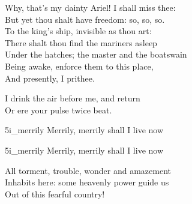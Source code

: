 \begin{song}
\end{song}

\begin{verse_speech}[Prospero] 
Why, that's my dainty Ariel! I shall miss thee:\\
But yet thou shalt have freedom: so, so, so.\\
To the king's ship, invisible as thou art:\\
There shalt thou find the mariners asleep\\
Under the hatches; the master and the boatswain\\
Being awake, enforce them to this place,\\
And presently, I prithee.
\end{verse_speech}

\begin{verse_speech}[Ariel] 
I drink the air before me, and return\\
Or ere your pulse twice beat.
\end{verse_speech}


\begin{pictures} %
	\begin{letter}
		\begin{colorbigpic}
			[1.1]
			{5i_merrily}
			{Merrily, merrily shall I live now}
		\end{colorbigpic}
	\end{letter}
	\begin{a4}
		\begin{colorbigpic}
			[1]
			{5i_merrily}
			{Merrily, merrily shall I live now}
		\end{colorbigpic}
	\end{a4}
\end{pictures}

\begin{verse_speech}[Gonzalo] 
All torment, trouble, wonder and amazement\\
Inhabits here: some heavenly power guide us\\
Out of this fearful country!
\end{verse_speech}

